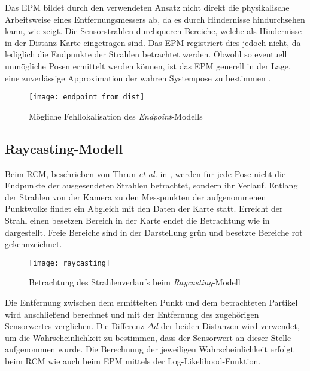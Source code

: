 Das EPM bildet durch den verwendeten Ansatz nicht direkt die physikalische Arbeitsweise eines Entfernungsmessers ab, da es durch Hindernisse \glqq hindurchsehen\grqq{} kann, wie  zeigt. Die Sensorstrahlen durchqueren Bereiche, welche als Hindernisse in der Distanz-Karte eingetragen sind. Das EPM registriert dies jedoch nicht, da lediglich die Endpunkte der Strahlen betrachtet werden. Obwohl so eventuell unmögliche Posen ermittelt werden können, ist das EPM generell in der Lage, eine zuverlässige Approximation der wahren Systempose zu bestimmen \cite{Konolige1999}.\\


\begin{figure}[!ht]
	\begin{center}
		\texttt{[image: endpoint\_from\_dist]}
		\caption{Mögliche Fehllokalisation des \textit{Endpoint}-Modells}
		\label{fig.endpoint}
	\end{center}
\end{figure}

\subsection{Raycasting-Modell}
Beim RCM, beschrieben von Thrun \textit{et al.} in \cite{Thrun2005}, werden für jede Pose nicht die Endpunkte der ausgesendeten Strahlen betrachtet, sondern ihr Verlauf. Entlang der Strahlen von der Kamera zu den Messpunkten der aufgenommenen Punktwolke findet ein Abgleich mit den Daten der Karte statt. Erreicht der Strahl einen besetzen Bereich in der Karte endet die Betrachtung wie in  dargestellt. Freie Bereiche sind in der Darstellung grün und besetzte Bereiche rot gekennzeichnet.

\begin{figure}[!ht]
	\begin{center}
		\texttt{[image: raycasting]}
		\caption{Betrachtung des Strahlenverlaufs beim \textit{Raycasting}-Modell}
		\label{fig.raycast}
	\end{center}
\end{figure}

Die Entfernung zwischen dem ermittelten Punkt und dem betrachteten Partikel wird anschließend berechnet und mit der Entfernung des zugehörigen Sensorwertes verglichen. Die Differenz $\Delta d$ der beiden Distanzen wird verwendet, um die Wahrscheinlichkeit zu bestimmen, dass der Sensorwert an dieser Stelle aufgenommen wurde. Die Berechnung der jeweiligen Wahrscheinlichkeit erfolgt beim RCM wie auch beim EPM mittels der Log-Likelihood-Funktion.\\

